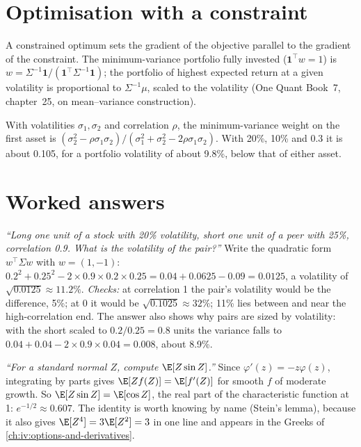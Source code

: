 \section{Optimisation with a constraint}

A constrained optimum sets the gradient of the objective parallel to the gradient of the constraint. The minimum-variance
portfolio fully invested ($\mathbf 1^\top w = 1$) is $w = \Sigma^{-1}\mathbf 1/(\mathbf 1^\top\Sigma^{-1}\mathbf 1)$; the
portfolio of highest expected return at a given volatility is proportional to $\Sigma^{-1}\mu$, scaled to the
volatility (One Quant Book~7, chapter~25, on mean--variance construction).

\begin{example}\label{ex:iv:linear-algebra-and-calculus:twoasset}
With volatilities $\sigma_1, \sigma_2$ and correlation $\rho$, the minimum-variance weight on the first asset is
$(\sigma_2^2 - \rho\sigma_1\sigma_2)/(\sigma_1^2 + \sigma_2^2 - 2\rho\sigma_1\sigma_2)$. With 20\%, 10\% and 0.3 it is
about 0.105, for a portfolio volatility of about 9.8\%, below that of either asset.
\end{example}

\section{Worked answers}

\begin{example}\label{ex:iv:linear-algebra-and-calculus:pair}
\emph{``Long one unit of a stock with 20\% volatility, short one unit of a peer with 25\%, correlation 0.9. What is the
volatility of the pair?''} Write the quadratic form $w^\top\Sigma w$ with $w = (1, -1)$: $0.2^2 + 0.25^2 - 2 \times 0.9
\times 0.2 \times 0.25 = 0.04 + 0.0625 - 0.09 = 0.0125$, a volatility of $\sqrt{0.0125} \approx 11.2\%$. \emph{Checks:} at
correlation 1 the pair's volatility would be the difference, 5\%; at 0 it would be $\sqrt{0.1025} \approx 32\%$; 11\% lies
between and near the high-correlation end. The answer also shows why pairs are sized by volatility: with the short
scaled to $0.2/0.25 = 0.8$ units the variance falls to $0.04 + 0.04 - 2 \times 0.9 \times 0.04 = 0.008$, about 8.9\%.
\end{example}

\begin{example}\label{ex:iv:linear-algebra-and-calculus:stein}
\emph{``For a standard normal $Z$, compute $\E[Z\sin Z]$.''} Since $\varphi'(z) = -z\varphi(z)$, integrating by parts gives
$\E[Zf(Z)] = \E[f'(Z)]$ for smooth $f$ of moderate growth. So $\E[Z\sin Z] = \E[\cos Z]$, the real part of the
characteristic function at 1: $e^{-1/2} \approx 0.607$. The identity is worth knowing by name (Stein's lemma), because it
also gives $\E[Z^4] = 3\E[Z^2] = 3$ in one line and appears in the Greeks of \cref{ch:iv:options-and-derivatives}.
\end{example}

